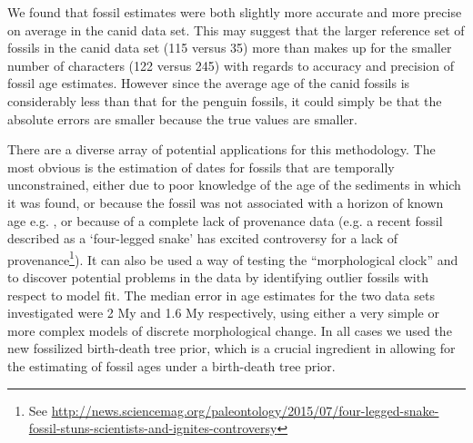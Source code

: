 \documentclass[11pt]{article}
\begin{document}
We found that fossil estimates were both slightly more accurate and more precise on average in the canid data set. 
This may suggest that the larger reference set of fossils in the canid data set (115 versus 35) more than makes up for the smaller number of characters (122 versus 245) with regards to accuracy and precision of fossil age estimates. However since the average age of the canid fossils is considerably less than that for the penguin fossils, it could simply be that the absolute errors are smaller because the true values are smaller.

There are a diverse array of potential applications for this methodology. 
The most obvious is the estimation of dates for fossils that are temporally unconstrained, either due to poor knowledge of the age of the sediments in which it was found, 
or because the fossil was not associated with a horizon of known age e.g. \cite{Berger2015},
or because of a complete lack of provenance data (e.g. a recent fossil described as a `four-legged snake' has excited controversy for a lack of provenance\footnote{See \url{http://news.sciencemag.org/paleontology/2015/07/four-legged-snake-fossil-stuns-scientists-and-ignites-controversy}}). 
It can also be used a way of testing the ``morphological clock'' and to discover potential problems in the data by identifying outlier fossils with respect to model fit. 
The median error in age estimates for the two data sets investigated were 2 My and 1.6 My respectively, using either a very simple or more complex models of discrete morphological change. 
In all cases we used the new fossilized birth-death tree prior, which is a crucial ingredient in allowing for the estimating of fossil ages under a birth-death tree prior. 
\end{document}
